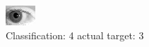 \begin{figure}[h!]
\begin{center}
\includegraphics[width=0.60\columnwidth]{figures/ID202_class_4_target_3.png}
\end{center}
\caption{ Classification: 4 actual target: 3}
\label{fig:ID202_class_4_target_3}
\end{figure}
